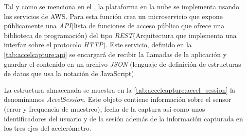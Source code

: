 Tal y como se menciona en el , la plataforma en la nube se implementa usando los servicios de AWS. Para esta función crea un microservicio que expone públicamente una \textit{API}(lista de funciones de acceso público que ofrece una biblioteca de programación) del tipo \textit{REST}(Arquitectura que implementa una interfaz sobre el protocolo \textit{HTTP}). Este servicio, definido en la \autoref{tab:accelcapture:api} se encargará de recibir la llamadas de la aplicación y guardar el contenido en un archivo \textit{JSON} (lenguaje de definición de estructuras de datos que usa la notación de JavaScript).


La estructura almacenada se muestra en la \autoref{tab:accelcapture:accel_session} la denominamos \textit{AccelSession}. Este objeto contiene información sobre el sensor (error y frequencia de muestreo), fecha de la captura así como unos identificadores del usuario y de la sesión además de la información capturada en los tres ejes del acelerómetro.



